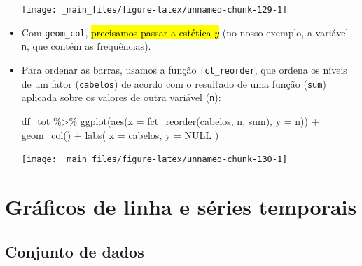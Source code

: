 \documentclass[
  11pt]{report}
\newenvironment{Shaded}{\begin{snugshade}}{\end{snugshade}}
\newcommand{\AttributeTok}[1]{\textcolor[rgb]{0.77,0.63,0.00}{#1}}
\newcommand{\ConstantTok}[1]{\textcolor[rgb]{0.00,0.00,0.00}{#1}}
\newcommand{\FunctionTok}[1]{\textcolor[rgb]{0.00,0.00,0.00}{#1}}
\newcommand{\NormalTok}[1]{#1}
\newcommand{\SpecialCharTok}[1]{\textcolor[rgb]{0.00,0.00,0.00}{#1}}
\newcommand{\StringTok}[1]{\textcolor[rgb]{0.31,0.60,0.02}{#1}}
\renewenvironment{Shaded}{
    \begin{mdframed}[%
      roundcorner=2pt,%
      innerleftmargin=5pt,%
      innerrightmargin=5pt,%
      topline=true,%
      leftline=true,%
      rightline=true,%
      bottomline=true,%
      linewidth=0.5pt,%
      linecolor=black!20,%
      backgroundcolor=black!2,%
      skipabove=2ex,%
      skipbelow=2.5ex%
    ]%
  }
  {
    \end{mdframed}
  }
\begin{document}
\begin{itemize}
  \begin{center}\texttt{[image: \_main\_files/figure-latex/unnamed-chunk-129-1]} \end{center}
\item
  Com \texttt{geom\_col}, {\hl{precisamos passar a estética $y$}} (no nosso exemplo, a variável \texttt{n}, que contém as frequências).
\item
  Para ordenar as barras, usamos a função \texttt{fct\_reorder}, que ordena os níveis de um fator (\texttt{cabelos}) de acordo com o resultado de uma função (\texttt{sum}) aplicada sobre os valores de outra variável (\texttt{n}):

\begin{Shaded}
\begin{Highlighting}[]
\NormalTok{df\_tot }\SpecialCharTok{\%\textgreater{}\%} 
  \FunctionTok{ggplot}\NormalTok{(}\FunctionTok{aes}\NormalTok{(}\AttributeTok{x =} \FunctionTok{fct\_reorder}\NormalTok{(cabelos, n, sum), }\AttributeTok{y =}\NormalTok{ n)) }\SpecialCharTok{+}
    \FunctionTok{geom\_col}\NormalTok{() }\SpecialCharTok{+}
    \FunctionTok{labs}\NormalTok{(}
      \AttributeTok{x =} \StringTok{\textquotesingle{}cabelos\textquotesingle{}}\NormalTok{,}
      \AttributeTok{y =} \ConstantTok{NULL}
\NormalTok{    )}
\end{Highlighting}
\end{Shaded}

  \begin{center}\texttt{[image: \_main\_files/figure-latex/unnamed-chunk-130-1]} \end{center}
\end{itemize}

\hypertarget{gruxe1ficos-de-linha-e-suxe9ries-temporais}{%
\section{Gráficos de linha e séries temporais}\label{gruxe1ficos-de-linha-e-suxe9ries-temporais}}

\hypertarget{conjunto-de-dados-3}{%
\subsection{Conjunto de dados}\label{conjunto-de-dados-3}}
\end{document}
